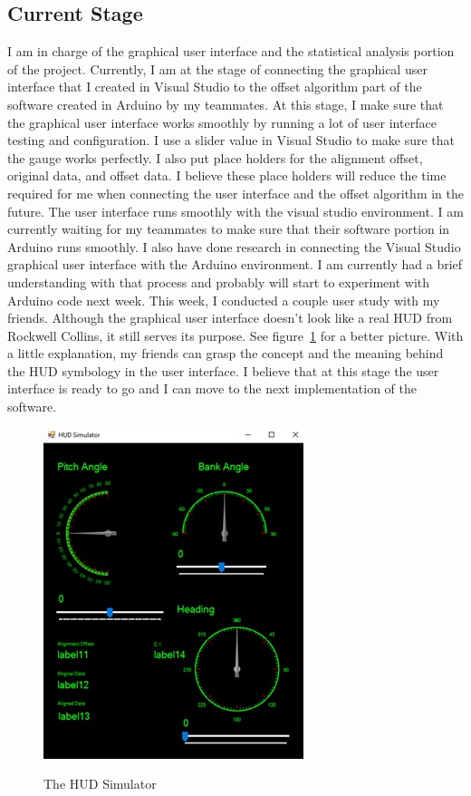\subsection{Current Stage}
I am in charge of the graphical user interface and the statistical analysis portion of the project. Currently, I am at the stage of connecting the graphical user interface that I created in Visual Studio to the offset algorithm part of the software created in Arduino by my teammates. At this stage, I make sure that the graphical user interface works smoothly by running a lot of user interface testing and configuration. I use a slider value in Visual Studio to make sure that the gauge works perfectly. I also put place holders for the alignment offset, original data, and offset data. I believe these place holders will reduce the time required for me when connecting the user interface and the offset algorithm in the future. The user interface runs smoothly with the visual studio environment. I am currently waiting for my teammates to make sure that their software portion in Arduino runs smoothly. I also have done research in connecting the Visual Studio graphical user interface with the Arduino environment. I am currently had a brief understanding with that process and probably will start to experiment with Arduino code next week. This week, I conducted a couple user study with my friends. Although the graphical user interface doesn’t look like a real HUD from Rockwell Collins, it still serves its purpose. See figure~\ref{fig:hudsim} for a better picture. With a little explanation, my friends can grasp the concept and the meaning behind the HUD symbology in the user interface. I believe that at this stage the user interface is ready to go and I can move to the next implementation of the software. 

\begin{figure}
    \caption{The HUD Simulator}
    \includegraphics{img/hudsim}
    \label{fig:hudsim}
\end{figure}

